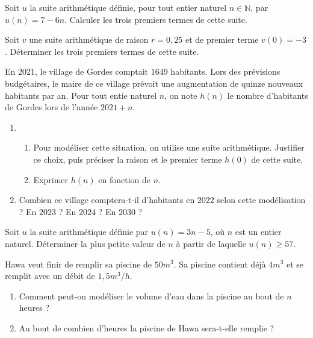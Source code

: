 \documentclass[11pt]{article}
\begin{document}
\begin{exo}
  Soit $u$ la suite arithmétique définie, pour tout entier naturel
  $n\in\mathbb{N}$, par $u(n) = 7-6n$. Calculer les trois premiers termes de cette suite.
\end{exo}

\begin{exo}
  Soit $v$ une suite arithmétique de raison $r=0,25$ et de premier terme
  $v(0)=-3$. Déterminer les trois premiers termes de cette suite.
\end{exo}

\begin{exo}
  En $2021$, le village de Gordes comptait $1649$ habitants. Lors des prévisions
  budgétaires, le maire de ce village prévoit une augmentation de quinze
  nouveaux habitants par an. Pour tout entie naturel $n$, on note $h(n)$ le
  nombre d'habitants de Gordes lors de l'année $2021+n$.
  \begin{enumerate}
    \item \begin{enumerate}
        \item Pour modéliser cette situation, on utilise une suite arithmétique.
          Justifier ce choix, puis préciser la raison et le premier terme $h(0)$
          de cette suite.
        \item Exprimer $h(n)$ en fonction de $n$.
      \end{enumerate}
    \item Combien ce village comptera-t-il d'habitants en $2022$ selon cette
      modélisation ? En $2023$ ? En $2024$ ? En $2030$ ?
  \end{enumerate}
\end{exo}

\begin{exo}
  Soit $u$ la suite arithmétique définie par $u(n)=3n-5$, où $n$ est un entier
  naturel. Déterminer la plus petite valeur de $n$ à partir de laquelle
  $u(n)\geq 57$.
\end{exo}

\begin{exo}
  Hawa veut finir de remplir sa piscine de $50m^3$. Sa piscine contient déjà
  $4m^3$ et se remplit avec un débit de $1,5m^3/h$.
  \begin{enumerate}
    \item Comment peut-on modéliser le volume d'eau dans la piscine au bout de
      $n$ heures ?
    \item Au bout de combien d'heures la piscine de Hawa sera-t-elle remplie ?
  \end{enumerate}
\end{exo}
\end{document}
